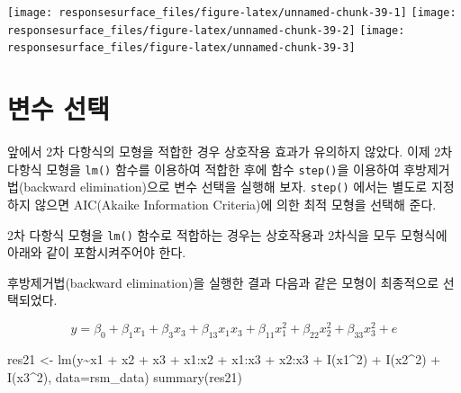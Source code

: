 \documentclass[
]{book}
\newenvironment{Shaded}{\begin{snugshade}}{\end{snugshade}}
\newcommand{\AttributeTok}[1]{\textcolor[rgb]{0.77,0.63,0.00}{#1}}
\newcommand{\DecValTok}[1]{\textcolor[rgb]{0.00,0.00,0.81}{#1}}
\newcommand{\FunctionTok}[1]{\textcolor[rgb]{0.00,0.00,0.00}{#1}}
\newcommand{\NormalTok}[1]{#1}
\newcommand{\OtherTok}[1]{\textcolor[rgb]{0.56,0.35,0.01}{#1}}
\newcommand{\SpecialCharTok}[1]{\textcolor[rgb]{0.00,0.00,0.00}{#1}}
\theoremstyle{definition}
\theoremstyle{definition}
\theoremstyle{definition}
\theoremstyle{definition}
\theoremstyle{remark}
\begin{document}
\texttt{[image: responsesurface\_files/figure-latex/unnamed-chunk-39-1]} \texttt{[image: responsesurface\_files/figure-latex/unnamed-chunk-39-2]} \texttt{[image: responsesurface\_files/figure-latex/unnamed-chunk-39-3]}

\hypertarget{uxbcc0uxc218-uxc120uxd0dd}{%
\section{변수 선택}\label{uxbcc0uxc218-uxc120uxd0dd}}

앞에서 2차 다항식의 모형을 적합한 경우 상호작용 효과가 유의하지 않았다. 이제
2차 다항식 모형을 \texttt{lm()} 함수를 이용하여 적합한 후에 함수 \texttt{step()}을 이용하여 후방제거법(backward elimination)으로 변수 선택을 실행해 보자. \texttt{step()} 에서는 별도로 지정하지 않으면 AIC(Akaike Information Criteria)에 의한 최적 모형을 선택해 준다.

2차 다항식 모형을 \texttt{lm()} 함수로 적합하는 경우는 상호작용과 2차식을 모두 모형식에 아래와 같이 포함시켜주어야 한다.

후방제거법(backward elimination)을 실행한 결과 다음과 같은 모형이 최종적으로 선택되었다.

\[ y= \beta_0 + \beta_1 x_1 + \beta_3 x_3 + \beta_{13} x_1 x_3 + \beta_{11} x_1^2 + \beta_{22} x_2^2 + \beta_{33} x_3^2 + e \]

\begin{Shaded}
\begin{Highlighting}[]
\NormalTok{res21 }\OtherTok{\textless{}{-}} \FunctionTok{lm}\NormalTok{(y}\SpecialCharTok{\textasciitilde{}}\NormalTok{x1 }\SpecialCharTok{+}\NormalTok{ x2 }\SpecialCharTok{+}\NormalTok{ x3 }\SpecialCharTok{+}\NormalTok{ x1}\SpecialCharTok{:}\NormalTok{x2 }\SpecialCharTok{+}\NormalTok{ x1}\SpecialCharTok{:}\NormalTok{x3 }\SpecialCharTok{+}\NormalTok{ x2}\SpecialCharTok{:}\NormalTok{x3 }\SpecialCharTok{+} \FunctionTok{I}\NormalTok{(x1}\SpecialCharTok{\^{}}\DecValTok{2}\NormalTok{) }\SpecialCharTok{+} \FunctionTok{I}\NormalTok{(x2}\SpecialCharTok{\^{}}\DecValTok{2}\NormalTok{) }\SpecialCharTok{+} \FunctionTok{I}\NormalTok{(x3}\SpecialCharTok{\^{}}\DecValTok{2}\NormalTok{), }\AttributeTok{data=}\NormalTok{rsm\_data)}
\FunctionTok{summary}\NormalTok{(res21)}
\end{Highlighting}
\end{Shaded}
\end{document}
